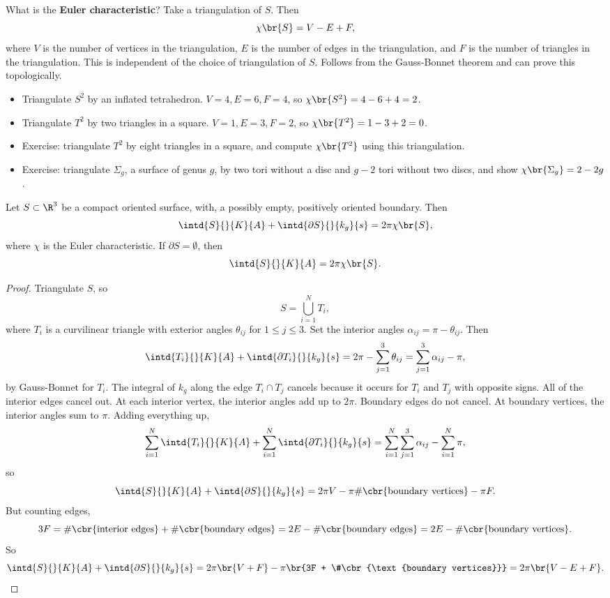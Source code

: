 What is the \textbf{Euler characteristic}? Take a triangulation of $ S $. Then
$$ \chi\br{S} = V - E + F, $$
where $ V $ is the number of vertices in the triangulation, $ E $ is the number of edges in the triangulation, and $ F $ is the number of triangles in the triangulation. This is independent of the choice of triangulation of $ S $. Follows from the Gauss-Bonnet theorem and can prove this topologically.

\begin{example*}
\hfill
\begin{itemize}
\item Triangulate $ S^2 $ by an inflated tetrahedron. $ V = 4, E = 6, F = 4 $, so $ \chi\br{S^2} = 4 - 6 + 4 = 2 $.
\item Triangulate $ T^2 $ by two triangles in a square. $ V = 1, E = 3, F = 2 $, so $ \chi\br{T^2} = 1 - 3 + 2 = 0 $.
\item Exercise: triangulate $ T^2 $ by eight triangles in a square, and compute $ \chi\br{T^2} $ using this triangulation.
\item Exercise: triangulate $ \Sigma_g $, a surface of genus $ g $, by two tori without a disc and $ g - 2 $ tori without two discs, and show $ \chi\br{\Sigma_g} = 2 - 2g $.
\end{itemize}
\end{example*}

\pagebreak

\begin{theorem}
Let $ S \subset \R^3 $ be a compact oriented surface, with, a possibly empty, positively oriented boundary. Then
$$ \intd{S}{}{K}{A} + \intd{\partial S}{}{k_g}{s} = 2\pi\chi\br{S}, $$
where $ \chi $ is the Euler characteristic. If $ \partial S = \emptyset $, then
$$ \intd{S}{}{K}{A} = 2\pi\chi\br{S}. $$
\end{theorem}

\begin{proof}
Triangulate $ S $, so
$$ S = \bigcup_{i = 1}^N T_i, $$
where $ T_i $ is a curvilinear triangle with exterior angles $ \theta_{ij} $ for $ 1 \le j \le 3 $. Set the interior angles $ \alpha_{ij} = \pi - \theta_{ij} $. Then
$$ \intd{T_i}{}{K}{A} + \intd{\partial T_i}{}{k_g}{s} = 2\pi - \sum_{j = 1}^3 \theta_{ij} = \sum_{j = 1}^3 \alpha_{ij} - \pi, $$
by Gauss-Bonnet for $ T_i $. The integral of $ k_g $ along the edge $ T_i \cap T_j $ cancels because it occurs for $ T_i $ and $ T_j $ with opposite signs. All of the interior edges cancel out. At each interior vertex, the interior angles add up to $ 2\pi $. Boundary edges do not cancel. At boundary vertices, the interior angles sum to $ \pi $. Adding everything up,
$$ \sum_{i = 1}^N \intd{T_i}{}{K}{A} + \sum_{i = 1}^N \intd{\partial T_i}{}{k_g}{s} = \sum_{i = 1}^N \sum_{j = 1}^3 \alpha_{ij} - \sum_{i = 1}^N \pi, $$
so
$$ \intd{S}{}{K}{A} + \intd{\partial S}{}{k_g}{s} = 2\pi V - \pi\#\cbr{\text{boundary vertices}} - \pi F. $$
But counting edges,
$$ 3F = \#\cbr{\text{interior edges}} + \#\cbr{\text{boundary edges}} = 2E - \#\cbr{\text{boundary edges}} = 2E - \#\cbr{\text{boundary vertices}}. $$
So
$$ \intd{S}{}{K}{A} + \intd{\partial S}{}{k_g}{s} = 2\pi\br{V + F} - \pi\br{3F + \#\cbr{\text{boundary vertices}}} = 2\pi\br{V - E + F}. $$
\end{proof}


